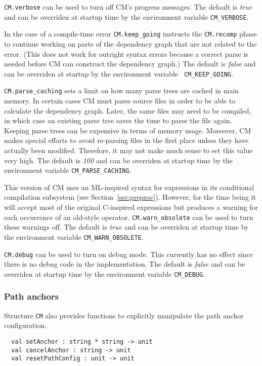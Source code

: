 \documentclass{article}
\begin{document}
{\tt CM.verbose} can be used to turn off CM's progress messages.  The
default is {\em true} and can be overriden at startup time by the
environment variable {\tt CM\_VERBOSE}.

In the case of a compile-time error {\tt CM.keep\_going} instructs the
{\tt CM.recomp} phase to continue working on parts of the dependency
graph that are not related to the error.  (This does not work for
outright syntax errors because a correct parse is needed before CM can
construct the dependency graph.)  The default is {\em false} and can
be overriden at startup by the environment variable {\tt
CM\_KEEP\_GOING}.

{\tt CM.parse\_caching} sets a limit on how many parse trees are
cached in main memory.  In certain cases CM must parse source files in
order to be able to calculate the dependency graph.  Later, the same
files may need to be compiled, in which case an existing parse tree
saves the time to parse the file again.  Keeping parse trees can be
expensive in terms of memory usage.  Moreover, CM makes special
efforts to avoid re-parsing files in the first place unless they have
actually been modified.  Therefore, it may not make much sense to set
this value very high.  The default is {\em 100} and can be overriden
at startup time by the environment variable {\tt CM\_PARSE\_CACHING}.

This version of CM uses an ML-inspired syntax for expressions in its
conditional compilation subsystem (see Section~\ref{sec:preproc}).
However, for the time being it will accept most of the original
C-inspired expressions but produces a warning for each occurrence of
an old-style operator. {\tt CM.warn\_obsolete} can be used to turn
these warnings off. The default is {\em true} and can be overriden at
startup time by the environment variable {\tt CM\_WARN\_OBSOLETE}.

{\tt CM.debug} can be used to turn on debug mode.  This currently has
no effect since there is no debug code in the implementation. The
default is {\em false} and can be overriden at startup time by the
environment variable {\tt CM\_DEBUG}.

\subsubsection*{Path anchors}

Structure {\tt CM} also provides functions to explicitly manipulate
the path anchor configuration.

\begin{verbatim}
  val setAnchor : string * string -> unit
  val cancelAnchor : string -> unit
  val resetPathConfig : unit -> unit
\end{verbatim}
\end{document}
